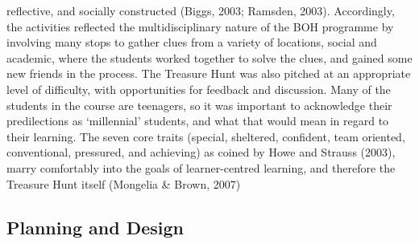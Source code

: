 reflective, and socially constructed (Biggs, 2003; Ramsden, 2003). Accordingly, the 
activities reflected the multidisciplinary nature of the BOH programme by involving many 
stops to gather clues from a variety of locations, social and academic, where the students 
worked together to solve the clues, and gained some new friends in the process. The 
Treasure Hunt was also pitched at an appropriate level of difficulty, with opportunities for 
feedback and discussion. Many of the students in the course are teenagers, so it was 
important to acknowledge their predilections as ‘millennial’ students, and what that would 
mean in regard to their learning. The seven core traits (special, sheltered, confident, team 
oriented, conventional, pressured, and achieving) as coined by Howe and Strauss (2003), 
marry comfortably into the goals of learner-centred learning, and therefore the Treasure 
Hunt itself (Mongelia & Brown, 2007)

\subsection{Planning and Design}

